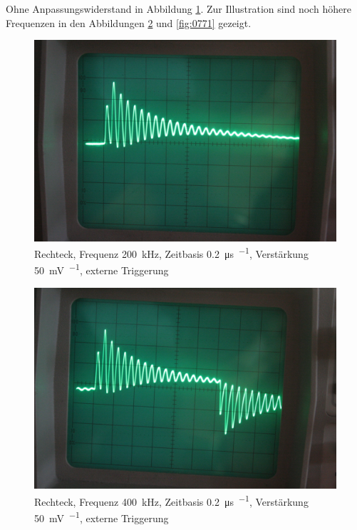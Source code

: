Ohne Anpassungswiderstand in Abbildung \ref{fig:0769}. Zur Illustration sind
noch höhere Frequenzen in den Abbildungen \ref{fig:0770} und \ref{fig:0771}
gezeigt.

\begin{figure}
	\centering
	\begin{minipage}{.45\linewidth}
	\end{minipage}
	\hfill
	\begin{minipage}{.45\linewidth}
	\includegraphics[width=\linewidth]{Fotos/IMG_0769-1500.jpg}
	\end{minipage}
	\caption{%
		Rechteck, Frequenz \SI{200}{\kilo\hertz},
		Zeitbasis \SI{.2}{\micro\second\per\division},
		Verstärkung \SI{50}{\milli\volt\per\division},
		externe Triggerung
	}
	\label{fig:0769}
\end{figure}

\begin{figure}
	\centering
	\begin{minipage}{.45\linewidth}
	\end{minipage}
	\hfill
	\begin{minipage}{.45\linewidth}
	\includegraphics[width=\linewidth]{Fotos/IMG_0770-1500.jpg}
	\end{minipage}
	\caption{%
		Rechteck, Frequenz \SI{400}{\kilo\hertz},
		Zeitbasis \SI{.2}{\micro\second\per\division},
		Verstärkung \SI{50}{\milli\volt\per\division},
		externe Triggerung
	}
	\label{fig:0770}
\end{figure}

